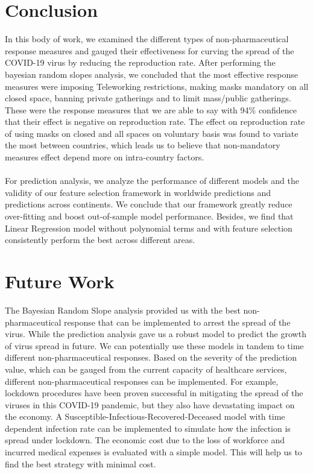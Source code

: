 \documentclass{article}
\begin{document}
\section{Conclusion}
In this body of work, we examined the different types of non-pharmaceutical response measures and gauged their effectiveness for curving the spread of the COVID-19 virus by reducing the reproduction rate. After performing the bayesian random slopes analysis, we concluded that the most effective response measures were imposing Teleworking restrictions, making masks mandatory on all closed space, banning private gatherings and to limit mass/public gatherings. These were the response measures that we are able to say with 94\% confidence that their effect is negative on reproduction rate. The effect on reproduction rate of using masks on closed and all spaces on voluntary basis was found to variate the most between countries, which leads us to believe that non-mandatory measures effect depend more on intra-country factors. \\
\\
\noindent For prediction analysis, we analyze the performance of different models and the validity of our feature selection framework in worldwide predictions and predictions across continents. We conclude that our framework greatly reduce over-fitting and boost out-of-sample model performance. Besides, we find that Linear Regression model without polynomial terms and with feature selection consistently perform the best across different areas.

\section{Future Work}
The Bayesian Random Slope analysis provided us with the best non-pharmaceutical response that can be implemented to arrest the spread of the virus. While the prediction analysis gave us a robust model to predict the growth of virus spread in future. We can potentially use these models in tandem to time different non-pharmaceutical responses. Based on the severity of the prediction value, which can be gauged from the current capacity of healthcare services, different non-pharmaceutical responses can be implemented. For example, lockdown procedures have been proven successful in mitigating the spread of the viruses in this COVID-19 pandemic, but they also have devastating impact on the economy. A Susceptible-Infectious-Recovered-Deceased model\cite{lockdown} with time dependent infection rate can be implemented to simulate how the infection is spread under lockdown. The economic cost due to the loss of workforce and incurred medical expenses is evaluated with a simple model. This will help us to find the best strategy with minimal cost. 
\end{document}
